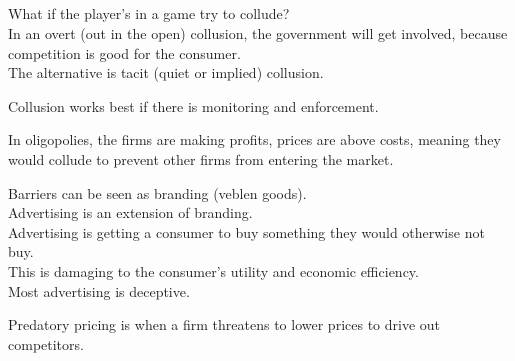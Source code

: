\subsection{}
What if the player's in a game try to collude?\\
In an overt (out in the open) collusion, the government will get involved, because competition is good for the consumer.\\
The alternative is tacit (quiet or implied) collusion.
\par
Collusion works best if there is monitoring and enforcement.
\par
In oligopolies, the firms are making profits, prices are above costs, meaning they would collude to prevent other firms from entering the market.
\par
Barriers can be seen as branding (veblen goods).\\
Advertising is an extension of branding.\\
Advertising is getting a consumer to buy something they would otherwise not buy.\\
This is damaging to the consumer's utility and economic efficiency.\\
Most advertising is deceptive.
\par
Predatory pricing is when a firm threatens to lower prices to drive out competitors.